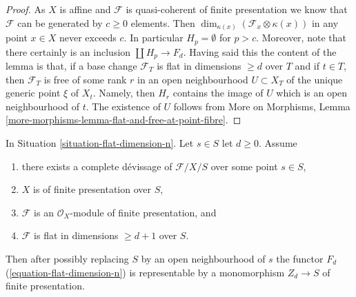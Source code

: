 \begin{proof}
As $X$ is affine and $\mathcal{F}$ is quasi-coherent of finite presentation
we know that $\mathcal{F}$ can be generated by $c \geq 0$ elements.
Then $\dim_{\kappa(x)}(\mathcal{F}_x \otimes \kappa(x))$
in any point $x \in X$ never exceeds $c$. In particular $H_p = \emptyset$
for $p > c$. Moreover, note that there certainly is an inclusion
$\coprod H_p \to F_d$. Having said this the content
of the lemma is that, if a base change $\mathcal{F}_T$ is flat in
dimensions $\geq d$ over $T$ and if $t \in T$, then $\mathcal{F}_T$ is
free of some rank $r$ in an open neighbourhood $U \subset X_T$
of the unique generic point $\xi$ of $X_t$. Namely, then $H_r$
contains the image of $U$ which is an open neighbourhood of $t$.
The existence of $U$ follows from
More on Morphisms, Lemma
\ref{more-morphisms-lemma-flat-and-free-at-point-fibre}.
\end{proof}

\begin{lemma}
\label{lemma-flat-dimension-n-representable}
In Situation \ref{situation-flat-dimension-n}.
Let $s \in S$ let $d \geq 0$. Assume
\begin{enumerate}
\item there exists a complete d\'evissage
of $\mathcal{F}/X/S$ over some point $s \in S$,
\item $X$ is of finite presentation over $S$,
\item $\mathcal{F}$ is an $\mathcal{O}_X$-module of finite presentation, and
\item $\mathcal{F}$ is flat in dimensions $\geq d + 1$ over $S$.
\end{enumerate}
Then after possibly replacing $S$ by an open neighbourhood
of $s$ the functor $F_d$ (\ref{equation-flat-dimension-n})
is representable by a monomorphism $Z_d \to S$ of finite presentation.
\end{lemma}


